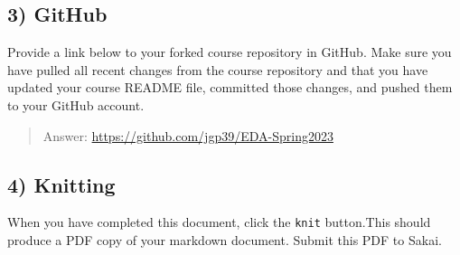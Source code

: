 \documentclass[
]{article}
\begin{document}
\hypertarget{github}{%
\subsection{3) GitHub}\label{github}}

Provide a link below to your forked course repository in GitHub. Make
sure you have pulled all recent changes from the course repository and
that you have updated your course README file, committed those changes,
and pushed them to your GitHub account.

\begin{quote}
Answer: \url{https://github.com/jgp39/EDA-Spring2023}
\end{quote}

\hypertarget{knitting}{%
\subsection{4) Knitting}\label{knitting}}

When you have completed this document, click the \texttt{knit}
button.This should produce a PDF copy of your markdown document. Submit
this PDF to Sakai.
\end{document}
